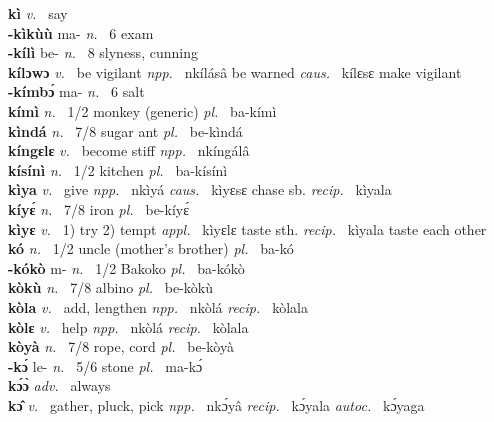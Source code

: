 {\bfseries kì}  {\itshape v.~} say    \\ 
{\bfseries -kìkùù} ma- {\itshape n.~} 6 exam    \\ 
{\bfseries -kílì} be- {\itshape n.~} 8 slyness, cunning    \\ 
{\bfseries kílɔwɔ}  {\itshape v.~} be vigilant   {\itshape npp.~} nkílásâ be warned {\itshape caus.~} kílɛsɛ make vigilant  \\ 
{\bfseries -kímbɔ́} ma- {\itshape n.~} 6 salt    \\ 
{\bfseries kímì}  {\itshape n.~} 1/2 monkey (generic) {\itshape pl.~} ba-kímì    \\ 
{\bfseries kìndá}  {\itshape n.~} 7/8 sugar ant {\itshape pl.~} be-kìndá    \\ 
{\bfseries kíngɛlɛ}  {\itshape v.~} become stiff   {\itshape npp.~} nkíngálâ  \\ 
{\bfseries kísínì}  {\itshape n.~} 1/2 kitchen {\itshape pl.~} ba-kísínì    \\ 
{\bfseries kìya}  {\itshape v.~} give {\itshape npp.~} nkìyá {\itshape caus.~} kìyɛsɛ chase sb. {\itshape recip.~} kìyala  \\ 
{\bfseries kíyɛ́}  {\itshape n.~} 7/8 iron {\itshape pl.~} be-kíyɛ́    \\ 
{\bfseries kìyɛ}  {\itshape v.~} 1) try 2) tempt  {\itshape appl.~} kìyɛlɛ taste sth. {\itshape recip.~} kìyala taste each other  \\ 
{\bfseries kó}  {\itshape n.~} 1/2 uncle (mother's brother) {\itshape pl.~} ba-kó    \\ 
{\bfseries -kókò} m- {\itshape n.~} 1/2 Bakoko {\itshape pl.~} ba-kókò   \\ 
{\bfseries kòkù}  {\itshape n.~} 7/8 albino {\itshape pl.~} be-kòkù    \\ 
{\bfseries kòla}  {\itshape v.~} add, lengthen   {\itshape npp.~} nkòlá {\itshape recip.~} kòlala  \\ 
{\bfseries kòlɛ}  {\itshape v.~} help   {\itshape npp.~} nkòlá {\itshape recip.~} kòlala  \\
{\bfseries kòyà}  {\itshape n.~} 7/8 rope, cord {\itshape pl.~} be-kòyà    \\ 
{\bfseries -kɔ́} le- {\itshape n.~} 5/6 stone {\itshape pl.~} ma-kɔ́    \\ 
{\bfseries kɔ́ɔ̀}  {\itshape adv.~} always    \\ 
{\bfseries kɔ̂}  {\itshape v.~} gather, pluck, pick   {\itshape npp.~} nkɔ́yâ {\itshape recip.~} kɔ́yala {\itshape autoc.~} kɔ́yaga  \\ 
